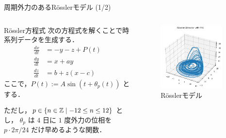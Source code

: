 \begin{frame}{周期外力のあるRösslerモデル (1/2)}
    \vspace{-.35cm}
    \begin{columns}[T] %
  
      \begin{column}{.5\textwidth}
        \begin{block}{Rössler方程式}
            次の方程式を解くことで時系列データを生成する．
            \begin{align}
                \frac{dx}{dt} &= -y - z + P(t)\\
                \frac{dy}{dt} &= x + ay \\
                \frac{dz}{dt} &= b + z(x - c)
            \end{align}
            ここで，$P(t) := A \sin(t + \theta_p(t))$ とする．
           
            ただし，$p \in \left\{ n \in \mathbb{Z} \mid -12 \leq n \leq 12 \right\}$ とし，
            $\theta_p$ は $4$ 日に $1$ 度外力の位相を $p\cdot 2\pi/24$ だけ早めるような関数．
        \end{block}
      \end{column}
      \begin{column}{.5\textwidth}
        \vspace{-.6cm}
        \begin{figure}
            \includegraphics[width=0.9\textwidth]{Fig/NEWrossler_attractor.png}
            \caption{\scriptsize{Rösslerモデル}}
        \end{figure}
        
      \end{column}
    \end{columns}
  \end{frame}

